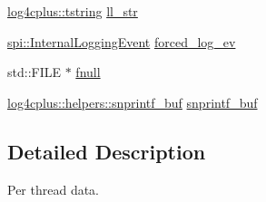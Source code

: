 \begin{DoxyCompactItemize}
\item 
\hyperlink{namespacelog4cplus_a3c9287f6ebcddc50355e29d71152117b}{log4cplus\-::tstring} \hyperlink{structlog4cplus_1_1internal_1_1per__thread__data_a9818644f9c5f694c408701aca0ff5a8b}{ll\-\_\-str}
\item 
\hyperlink{classlog4cplus_1_1spi_1_1InternalLoggingEvent}{spi\-::\-Internal\-Logging\-Event} \hyperlink{structlog4cplus_1_1internal_1_1per__thread__data_a5e948e1c176619e17f6fc543a42281ac}{forced\-\_\-log\-\_\-ev}
\item 
std\-::\-F\-I\-L\-E $\ast$ \hyperlink{structlog4cplus_1_1internal_1_1per__thread__data_a01ce75c055dfff618f03d719108b42de}{fnull}
\item 
\hyperlink{classlog4cplus_1_1helpers_1_1snprintf__buf}{log4cplus\-::helpers\-::snprintf\-\_\-buf} \hyperlink{structlog4cplus_1_1internal_1_1per__thread__data_ac3447a9bb6d2f41a00f491f81c63093f}{snprintf\-\_\-buf}
\end{DoxyCompactItemize}


\subsection{Detailed Description}
Per thread data. 

